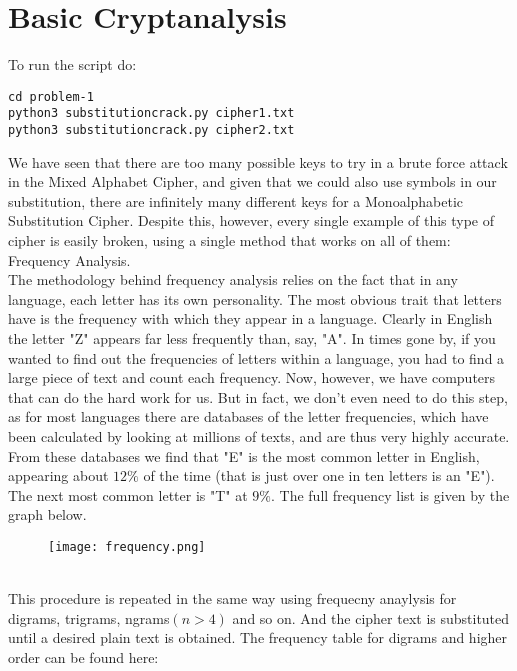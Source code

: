 \documentclass{exam}
\begin{document}
\section{Basic Cryptanalysis}
To run the script do:
\begin{center}
    \texttt{cd problem-1} \\
    \texttt{python3 substitutioncrack.py cipher1.txt} \\
    \texttt{python3 substitutioncrack.py cipher2.txt}
\end{center}
We have seen that there are too many possible keys to try in a brute force attack in the Mixed Alphabet Cipher, and given that we could also use symbols in our substitution, there are infinitely many different keys for a Monoalphabetic Substitution Cipher. Despite this, however, every single example of this type of cipher is easily broken, using a single method that works on all of them: Frequency Analysis. \vspace{0.05in} \\
The methodology behind frequency analysis relies on the fact that in any language, each letter has its own personality. The most obvious trait that letters have is the frequency with which they appear in a language. Clearly in English the letter "Z" appears far less frequently than, say, "A". In times gone by, if you wanted to find out the frequencies of letters within a language, you had to find a large piece of text and count each frequency. Now, however, we have computers that can do the hard work for us. But in fact, we don't even need to do this step, as for most languages there are databases of the letter frequencies, which have been calculated by looking at millions of texts, and are thus very highly accurate. \vspace{0.05in} \\
From these databases we find that "E" is the most common letter in English, appearing about $12\%$ of the time (that is just over one in ten letters is an "E"). The next most common letter is "T" at $9\%$. The full frequency list is given by the graph below. \vspace{0.05in} \\
\begin{figure}[h]
\centering
\texttt{[image: frequency.png]}
\end{figure} \\
This procedure is repeated in the same way using frequecny anaylysis for digrams, trigrams, ngrams$(n > 4)$ and so on. And the cipher text is substituted until a desired plain text is obtained. The frequency table for digrams and higher order can be found here: \vspace{0.05in} \\
\end{document}

